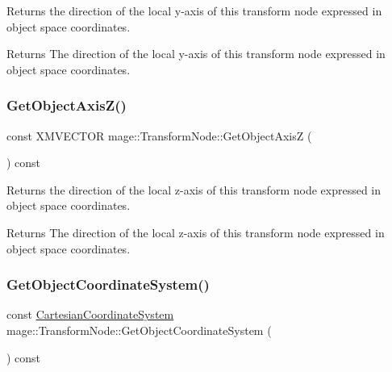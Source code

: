 Returns the direction of the local y-\/axis of this transform node expressed in object space coordinates.

\begin{DoxyReturn}{Returns}
The direction of the local y-\/axis of this transform node expressed in object space coordinates. 
\end{DoxyReturn}
\hypertarget{structmage_1_1_transform_node_a12e14a4d519295d6d1fb2b839061ef20}{}\label{structmage_1_1_transform_node_a12e14a4d519295d6d1fb2b839061ef20} 
\subsubsection{\texorpdfstring{Get\+Object\+Axis\+Z()}{GetObjectAxisZ()}}
{\footnotesize\ttfamily const X\+M\+V\+E\+C\+T\+OR mage\+::\+Transform\+Node\+::\+Get\+Object\+AxisZ (\begin{DoxyParamCaption}{ }\end{DoxyParamCaption}) const\hspace{0.3cm}{\ttfamily [noexcept]}}

Returns the direction of the local z-\/axis of this transform node expressed in object space coordinates.

\begin{DoxyReturn}{Returns}
The direction of the local z-\/axis of this transform node expressed in object space coordinates. 
\end{DoxyReturn}
\hypertarget{structmage_1_1_transform_node_a59417bfb21810840f90cee6a192e6ffd}{}\label{structmage_1_1_transform_node_a59417bfb21810840f90cee6a192e6ffd} 
\subsubsection{\texorpdfstring{Get\+Object\+Coordinate\+System()}{GetObjectCoordinateSystem()}}
{\footnotesize\ttfamily const \hyperlink{structmage_1_1_cartesian_coordinate_system}{Cartesian\+Coordinate\+System} mage\+::\+Transform\+Node\+::\+Get\+Object\+Coordinate\+System (\begin{DoxyParamCaption}{ }\end{DoxyParamCaption}) const\hspace{0.3cm}{\ttfamily [noexcept]}}

